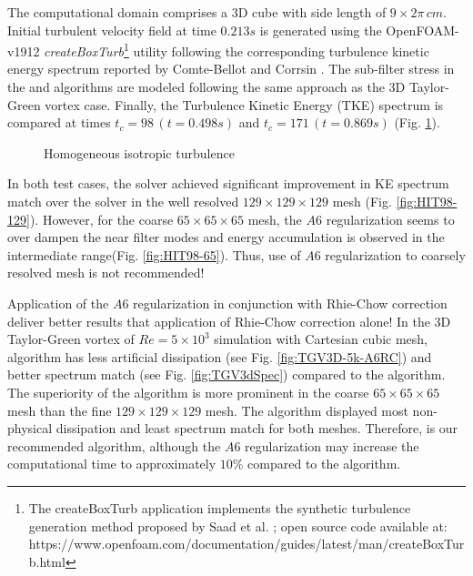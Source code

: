The computational domain comprises a 3D cube with side length of $9\times2\pi\, cm$. Initial turbulent velocity field at time $0.213s$ is generated using the OpenFOAM-v1912 \emph{createBoxTurb}\footnote{The createBoxTurb application implements the synthetic turbulence generation method proposed by Saad et al. \cite{Saad2016}; open source code available at: https://www.openfoam.com/documentation/guides/latest/man/createBoxTurb.html} utility following the corresponding turbulence kinetic energy spectrum reported by Comte-Bellot and Corrsin \cite[Table 3]{CBC1971}. The sub-filter stress in the \spaece and \spaeceA algorithms are modeled following the same approach as the 3D Taylor-Green vortex case. Finally, the Turbulence Kinetic Energy (TKE) spectrum is compared at times $t_c =98\, (t=0.498s)$ and $t_c =171\, (t=0.869s)$ (Fig. \ref{fig:HIT98}).

\begin{figure}[!h]
\centering
{}
\caption{Homogeneous isotropic turbulence } 
\label{fig:HIT98}
\end{figure}


In both test cases, the \spaeceA solver achieved significant improvement in KE spectrum match over the \spaece solver in the well resolved $129 \times 129 \times 129$ mesh (Fig. \ref{fig:HIT98-129}). However, for the coarse $65 \times 65 \times 65$ mesh, the $A6$ regularization seems to over dampen the near filter modes and energy accumulation is observed in the intermediate range(Fig. \ref{fig:HIT98-65}). Thus, use of $A6$ regularization to coarsely resolved mesh is not recommended!

Application of the $A6$ regularization in conjunction with Rhie-Chow correction deliver better results that application of Rhie-Chow correction alone! In the 3D Taylor-Green vortex of $Re = 5 \times 10^3$ simulation with Cartesian cubic mesh, \spaeceARC algorithm has less artificial dissipation (see Fig. \ref{fig:TGV3D-5k-A6RC}) and better spectrum match (see Fig. \ref{fig:TGV3dSpec}) compared to the \spaeceRC algorithm. The superiority of the \spaeceARC algorithm is more prominent in the coarse $65 \times 65 \times 65$ mesh than the fine $129 \times 129 \times 129$ mesh. The \piso algorithm displayed most non-physical dissipation and least spectrum match for both meshes. Therefore, \spaeceARC is our recommended algorithm, although the $A6$ regularization may increase the computational time to approximately $10 \%$ compared to the \spaeceRC algorithm.

